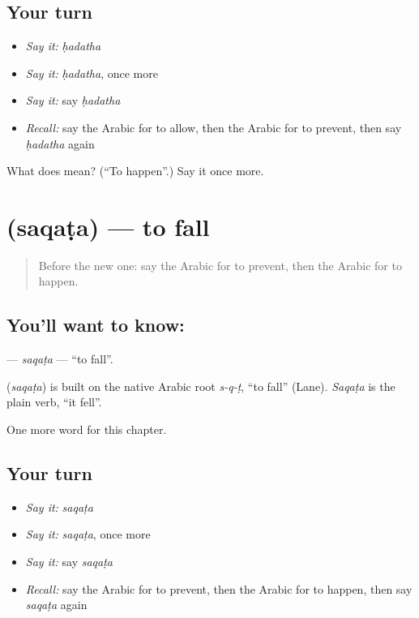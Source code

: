 \subsection*{Your turn}
\begin{itemize}
\raggedright
  \item \emph{Say it:} \emph{ḥadatha}
  \item \emph{Say it:} \emph{ḥadatha}, once more
  \item \emph{Say it:} say \emph{ḥadatha}
  \item \emph{Recall:} say the Arabic for to allow, then the Arabic for to prevent, then say \emph{ḥadatha} again
\end{itemize}

\begin{tcolorbox}[breakable,colback=teal!4,colframe=teal!35!black,title={Before you move on}]
What does  mean? (\textquotedblleft{}To happen\textquotedblright{}.) Say it once more.
\end{tcolorbox}
\section[\texorpdfstring{\ar{سقط} (saqaṭa)}{سقط (saqaṭa)}]{ (saqaṭa) — to fall}

\label{lesson:AR-C198-saqata}



\begin{quote}
Before the new one: say the Arabic for to prevent, then the Arabic for to happen.
\end{quote}

\subsection*{You'll want to know: }
\textbf{} — \emph{saqaṭa} — \textquotedblleft{}to fall\textquotedblright{}.

\begin{cousinweb}
\textbf{} (\emph{saqaṭa}) is built on the native Arabic root \emph{s-q-ṭ}, \textquotedblleft{}to fall\textquotedblright{} (Lane). \emph{Saqaṭa} is the plain verb, \textquotedblleft{}it fell\textquotedblright{}.
\end{cousinweb}

\begin{grammarlens}[title={What you've built}]
One more word for this chapter.
\end{grammarlens}

\subsection*{Your turn}
\begin{itemize}
\raggedright
  \item \emph{Say it:} \emph{saqaṭa}
  \item \emph{Say it:} \emph{saqaṭa}, once more
  \item \emph{Say it:} say \emph{saqaṭa}
  \item \emph{Recall:} say the Arabic for to prevent, then the Arabic for to happen, then say \emph{saqaṭa} again
\end{itemize}

